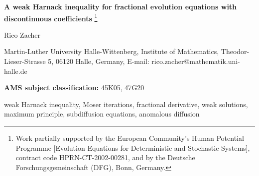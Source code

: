 \documentclass[10pt]{article}
\begin{document}
\begin{center}
{\bf\Large A weak Harnack inequality for fractional evolution
equations with discontinuous coefficients}
\renewcommand{\thefootnote}{\fnsymbol{footnote}}
\footnote[1]{Work partially supported by the European Community's
Human Potential Programme [Evolution Equations for Deterministic and
Stochastic Systems], contract code HPRN-CT-2002-00281, and by the
Deutsche Forschungsgemeinschaft (DFG), Bonn, Germany.}
\end{center}
\vspace{0.7em}
\begin{center}
Rico Zacher
\end{center}
{\footnotesize {} Martin-Luther University
Halle-Wittenberg, Institute of Mathematics, Theodor-Lieser-Strasse
5, 06120 Halle, Germany, E-mail:
rico.zacher@mathematik.uni-halle.de} \vspace{0.7em}
\begin{abstract}
We study linear time fractional diffusion equations in divergence
form of time order less than one. It is merely assumed that the
coefficients are measurable and bounded, and that they satisfy a
uniform parabolicity condition. As the main result we establish for
nonnegative weak supersolutions of such problems a weak Harnack
inequality with optimal critical exponent. The proof relies on new a
priori estimates for time fractional problems and uses Moser's
iteration technique and an abstract lemma of Bombieri and Giusti,
the latter allowing to avoid the rather technically involved
approach via $BMO$. As applications of the weak Harnack inequality
we establish the strong maximum principle, continuity of weak
solutions at $t=0$, and a Liouville type theorem.
\end{abstract}
\vspace{0.7em}
\begin{center}
{\bf AMS subject classification:} 45K05, 47G20
\end{center}

 weak Harnack inequality, Moser iterations,
fractional derivative, weak solutions, maximum principle,
subdiffusion equations, anomalous diffusion
\end{document}
